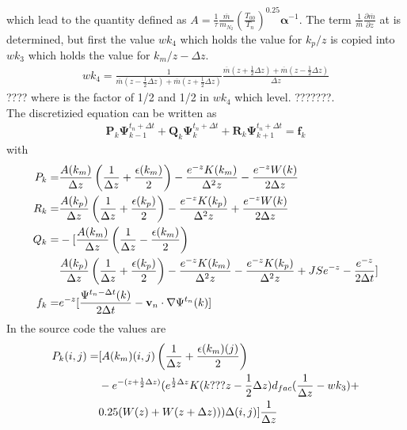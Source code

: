 %
 which lead to the quantity defined as $A = \frac{1}{\tau} \frac{\overline{m}}{m_{N_2}}\left(
\frac{T_{00}}{T_n}\right)^{0.25}\mathbf{\alpha}^{-1}$. The term
$\frac{1}{\overline{m}}\frac{\partial \overline{m}}{\partial z}$ at
is determined, but first the value  $wk_4$ which holds the value for
$k_p / z$ is copied into $wk_3$ which holds the value for $k_m /
z-\Delta z$.
%
\begin{align}
   wk_4  = \frac{1}{\overline{m}(z-\frac{1}{2}\Delta z) +\overline{m}(z+\frac{1}{2}\Delta z) }
      \frac{\overline{m}(z+\frac{1}{2}\Delta z) +\overline{m}(z-\frac{1}{2}\Delta z)}{\Delta z}
\end{align}
%
???? where is the factor of 1/2 and 1/2 in $wk_4$ which level.
???????. \\

The discretizied equation can be written as
%
\begin{align}
  \mathbf{P}_k \mathbf{\Psi}_{k-1}^{t_n+ \Delta t} +
  \mathbf{Q}_k \mathbf{\Psi}_{k}^{t_n+ \Delta t} +
  \mathbf{R}_k \mathbf{\Psi}_{k+1}^{t_n+ \Delta t} = \mathbf{f}_k
\end{align}
%
with
%
\begin{align}
  P_k = & \frac{A(k_m)}{\Delta z} \left(\frac{1}{\Delta z} + \frac{\epsilon(k_m)}{2} \right)
  - \frac{e^{-z} K(k_m)}{\Delta^2 z} - \frac{e^{-z} W(k)}{2 \Delta
  z} \\
  R_k = & \frac{A(k_p)}{\Delta z} \left(\frac{1}{\Delta z} + \frac{\epsilon(k_p)}{2} \right)
  - \frac{e^{-z} K(k_p)}{\Delta^2 z} + \frac{e^{-z} W(k)}{2 \Delta
  z} \\
  Q_k =&  - [\frac{A(k_m)}{\Delta z} \left(\frac{1}{\Delta z} - \frac{\epsilon(k_m)}{2} \right)  \\
    & \frac{A(k_p)}{\Delta z} \left(\frac{1}{\Delta z} + \frac{\epsilon(k_p)}{2} \right)
  - \frac{e^{-z} K(k_m)}{\Delta^2 z}- \frac{e^{-z} K(k_p)}{\Delta^2 z} + JSe^{-z} -
   \frac{e^{-z}}{2 \Delta t} ] \notag \\
   f_k = & e^{-z}[ \frac{\Psi^{t_n-\Delta t}(k)}{2 \Delta t} - \mathbf{v}_n \cdot \nabla \Psi^{t_n}(k)]
\end{align}
%
In the source code the values are
%
\begin{align}
  P_k(i,j) = & [{A(k_m)(i,j)}
   \left(\frac{1}{\Delta z} + \frac{\epsilon(k_m)(j)}{2} \right)
      \notag \\
  & - e^{-(z+\frac{1}{2}\Delta z)}( e^{\frac{1}{2}\Delta z}K(k???z-\frac{1}{2}\Delta z)d_{fac}
    (\frac{1}{\Delta z}-wk_3) + \notag \\
  & 0.25 (W(z)+W(z+\Delta z))) \Delta(i,j)] \frac{1}{\Delta z}
\end{align}
